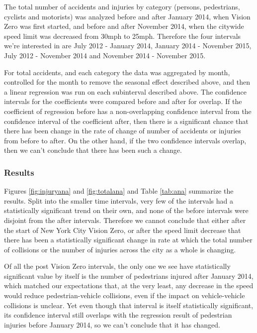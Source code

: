 \documentclass[10pt,journal,compsoc]{IEEEtran}
\begin{document}
The total number of accidents and injuries by category (persons, pedestrians, cyclists and motorists) was analyzed before and after January 2014, when Vision Zero was first started, and before and after November 2014, when the citywide speed limit was decreased from 30mph to 25mph.  Therefore the four intervals we're interested in are July 2012 - January 2014, January 2014 - November 2015, July 2012 - November 2014 and November 2014 - November 2015.

For total accidents, and each category the data was aggregated by month, controlled for the month to remove the seasonal effect described above, and then a linear regression was run on each subinterval described above.  The confidence intervals for the coefficients were compared before and after for overlap.  If the coefficient of regression before has a non-overlapping confidence interval from the confidence interval of the coefficient after, then there is a significant chance that there has been  change in the rate of change of number of accidents or injuries from before to after.  On the other hand, if the two confidence intervals overlap, then we can't conclude that there has been such a change.

\subsubsection{Results}

Figures \ref{fig:injuryana} and \ref{fig:totalana} and Table \ref{tab:ana} summarize the results.  Split into the smaller time intervals, very few of the intervals had a statistically significant trend on their own, and none of the before intervals were disjoint from the after intervals.  Therefore we cannot conclude that either after the start of New York City Vision Zero, or after the speed limit decrease that there has been a statistically significant change in rate at which the total number of collisions or the number of injuries across the city as a whole is changing.  

Of all the post Vision Zero intervals, the only one we see have statistically significant value by itself is the number of pedestrians injured after January 2014, which matched our expectations that, at the very least, any decrease in the speed would reduce pedestrian-vehicle collisions, even if the impact on vehicle-vehicle collisions is unclear.  Yet even though that interval is itself statistically significant, its confidence interval still overlaps with the regression result of pedestrian injuries before January 2014, so we can't conclude that it has changed.
\end{document}

